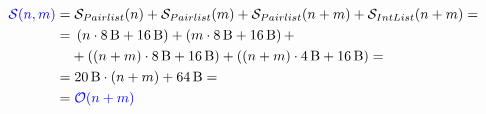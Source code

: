         \begin{frame}{\insertionseriesmergeaftersortrecursivecostframe}
            \begin{align*}
                \textcolor{blue}{\mathcal{S}{\left(n, m\right)}} = & \; \mathcal{S}_{Pairlist}{\left(n\right)} + \mathcal{S}_{Pairlist}{\left(m\right)} + \mathcal{S}_{Pairlist}{\left(n + m\right)} + \mathcal{S}_{IntList}{\left(n + m\right)} = \\
                = & \; \left(n \cdot \SI{8}{B} + \SI{16}{B}\right) + \left(m \cdot \SI{8}{B} + \SI{16}{B}\right) + \\
                & + \left(\left(n + m\right) \cdot \SI{8}{B} + \SI{16}{B}\right) + \left(\left(n + m\right) \cdot \SI{4}{B} + \SI{16}{B}\right) = \\
                = & \; \SI{20}{B} \cdot \left(n + m\right) + \SI{64}{B} = \\
                = & \; \textcolor{blue}{\mathcal{O}{\left(n + m\right)}}
            \end{align*}
        \end{frame}

